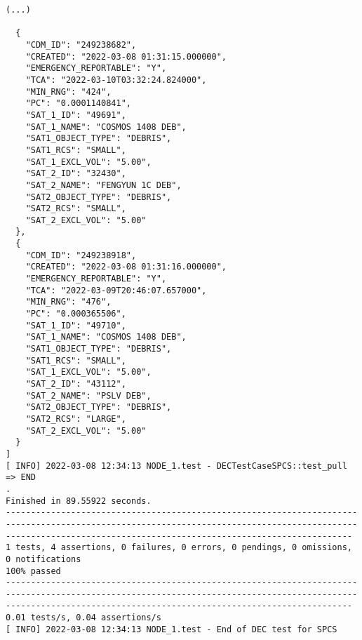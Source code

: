 \documentclass[dec_sum_main.tex]{subfiles}
\begin{document}
\begin{Verbatim}[fontsize=\tiny]
(...)

  {
    "CDM_ID": "249238682",
    "CREATED": "2022-03-08 01:31:15.000000",
    "EMERGENCY_REPORTABLE": "Y",
    "TCA": "2022-03-10T03:32:24.824000",
    "MIN_RNG": "424",
    "PC": "0.0001140841",
    "SAT_1_ID": "49691",
    "SAT_1_NAME": "COSMOS 1408 DEB",
    "SAT1_OBJECT_TYPE": "DEBRIS",
    "SAT1_RCS": "SMALL",
    "SAT_1_EXCL_VOL": "5.00",
    "SAT_2_ID": "32430",
    "SAT_2_NAME": "FENGYUN 1C DEB",
    "SAT2_OBJECT_TYPE": "DEBRIS",
    "SAT2_RCS": "SMALL",
    "SAT_2_EXCL_VOL": "5.00"
  },
  {
    "CDM_ID": "249238918",
    "CREATED": "2022-03-08 01:31:16.000000",
    "EMERGENCY_REPORTABLE": "Y",
    "TCA": "2022-03-09T20:46:07.657000",
    "MIN_RNG": "476",
    "PC": "0.000365506",
    "SAT_1_ID": "49710",
    "SAT_1_NAME": "COSMOS 1408 DEB",
    "SAT1_OBJECT_TYPE": "DEBRIS",
    "SAT1_RCS": "SMALL",
    "SAT_1_EXCL_VOL": "5.00",
    "SAT_2_ID": "43112",
    "SAT_2_NAME": "PSLV DEB",
    "SAT2_OBJECT_TYPE": "DEBRIS",
    "SAT2_RCS": "LARGE",
    "SAT_2_EXCL_VOL": "5.00"
  }
]
[ INFO] 2022-03-08 12:34:13 NODE_1.test - DECTestCaseSPCS::test_pull => END
.
Finished in 89.55922 seconds.
-----------------------------------------------------------------------------------------------------------------------------------------------------------------------------------------------------------------
1 tests, 4 assertions, 0 failures, 0 errors, 0 pendings, 0 omissions, 0 notifications
100% passed
-----------------------------------------------------------------------------------------------------------------------------------------------------------------------------------------------------------------
0.01 tests/s, 0.04 assertions/s
[ INFO] 2022-03-08 12:34:13 NODE_1.test - End of DEC test for SPCS

\end{Verbatim}
\end{document}
